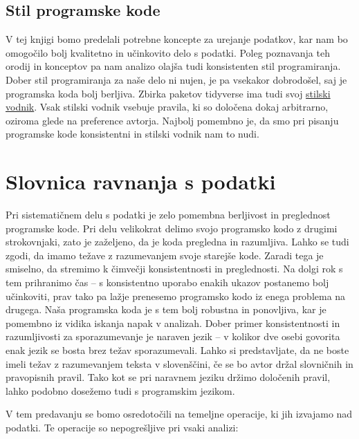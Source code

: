 \documentclass[
]{book}
\begin{document}
\hypertarget{stil-programske-kode}{%
\section*{Stil programske kode}\label{stil-programske-kode}}

V tej knjigi bomo predelali potrebne koncepte za urejanje podatkov, kar nam bo omogočilo bolj kvalitetno in učinkovito delo s podatki. Poleg poznavanja teh orodij in konceptov pa nam analizo olajša tudi konsistenten stil programiranja. Dober stil programiranja za naše delo ni nujen, je pa vsekakor dobrodošel, saj je programska koda bolj berljiva. Zbirka paketov tidyverse ima tudi svoj \href{https://style.tidyverse.org/}{stilski vodnik}. Vsak stilski vodnik vsebuje pravila, ki so določena dokaj arbitrarno, oziroma glede na preference avtorja. Najbolj pomembno je, da smo pri pisanju programske kode konsistentni in stilski vodnik nam to nudi.

\hypertarget{slovnica-ravnanja-s-podatki}{%
\chapter{Slovnica ravnanja s podatki}\label{slovnica-ravnanja-s-podatki}}

Pri sistematičnem delu s podatki je zelo pomembna berljivost in preglednost programske kode. Pri delu velikokrat delimo svojo programsko kodo z drugimi strokovnjaki, zato je zaželjeno, da je koda pregledna in razumljiva. Lahko se tudi zgodi, da imamo težave z razumevanjem svoje starejše kode. Zaradi tega je smiselno, da stremimo k čimvečji konsistentnosti in preglednosti. Na dolgi rok s tem prihranimo čas -- s konsistentno uporabo enakih ukazov postanemo bolj učinkoviti, prav tako pa lažje prenesemo programsko kodo iz enega problema na drugega. Naša programska koda je s tem bolj robustna in ponovljiva, kar je pomembno iz vidika iskanja napak v analizah. Dober primer konsistentnosti in razumljivosti za sporazumevanje je naraven jezik -- v kolikor dve osebi govorita enak jezik se bosta brez težav sporazumevali. Lahko si predstavljate, da ne boste imeli težav z razumevanjem teksta v slovenščini, če se bo avtor držal slovničnih in pravopisnih pravil. Tako kot se pri naravnem jeziku držimo določenih pravil, lahko podobno dosežemo tudi s programskim jezikom.

V tem predavanju se bomo osredotočili na temeljne operacije, ki jih izvajamo nad podatki. Te operacije so nepogrešljive pri vsaki analizi:
\end{document}
